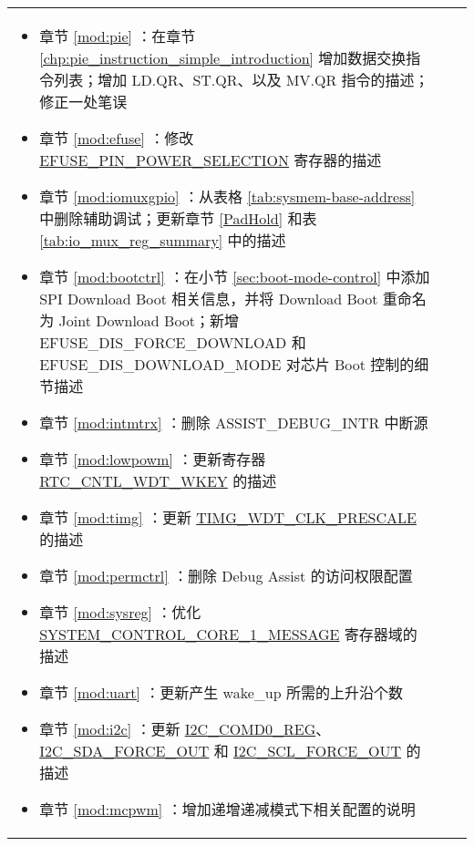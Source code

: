 \begin{longtable}[l]{ | m{2cm} | m{1.5cm} | m{12cm} | }
\begin{itemize}
        \item 章节 \ref{mod:pie} \textit{\nameref{mod:pie}}：在章节 \ref{chp:pie_instruction_simple_introduction} 增加数据交换指令列表；增加 LD.QR、ST.QR、以及 MV.QR 指令的描述；修正一处笔误 %
        \item 章节 \ref{mod:efuse} \textit{\nameref{mod:efuse}}：修改 \hyperref[fielddesc:EFUSEPINPOWERSELECTION]{EFUSE\_PIN\_POWER\_SELECTION} 寄存器的描述 %
        \item 章节 \ref{mod:iomuxgpio} \textit{\nameref{mod:iomuxgpio}}：从表格 \ref{tab:sysmem-base-address} 中删除辅助调试；更新章节 \ref{PadHold} 和表 \ref{tab:io_mux_reg_summary} 中的描述 %
        \item 章节 \ref{mod:bootctrl} \textit{\nameref{mod:bootctrl}}：在小节 \ref{sec:boot-mode-control} 中添加 SPI Download Boot 相关信息，并将 Download Boot 重命名为 Joint Download Boot；新增 EFUSE\_DIS\_FORCE\_DOWNLOAD 和 EFUSE\_DIS\_DOWNLOAD\_MODE 对芯片 Boot 控制的细节描述 %
        \item 章节 \ref{mod:intmtrx} \textit{\nameref{mod:intmtrx}}：删除 ASSIST\_DEBUG\_INTR 中断源 %
        \item 章节 \ref{mod:lowpowm} \textit{\nameref{mod:lowpowm}}：更新寄存器 \hyperref[fielddesc:RTCCNTLWDTWKEY]{RTC\_CNTL\_WDT\_WKEY} 的描述 %
        \item 章节 \ref{mod:timg} \textit{\nameref{mod:timg}}：更新 \hyperref[fielddesc:TIMGWDTCLKPRESCALE]{TIMG\_WDT\_CLK\_PRESCALE} 的描述 %
        \item 章节 \ref{mod:permctrl} \textit{\nameref{mod:permctrl}}：删除 Debug Assist 的访问权限配置  %
        \item 章节 \ref{mod:sysreg} \textit{\nameref{mod:sysreg}}：优化 \hyperref[fielddesc:SYSTEMCONTROLCORE1MESSAGE]{SYSTEM\_CONTROL\_CORE\_1\_MESSAGE} 寄存器域的描述 %
        \item 章节 \ref{mod:uart} \textit{\nameref{mod:uart}}：更新产生 wake\_up 所需的上升沿个数 %
        \item 章节 \ref{mod:i2c} \textit{\nameref{mod:i2c}}：更新 \hyperref[regdesc:I2CCOMD0REG]{I2C\_COMD0\_REG}、\hyperref[fielddesc:I2CSDAFORCEOUT]{I2C\_SDA\_FORCE\_OUT} 和 \hyperref[fielddesc:I2CSCLFORCEOUT]{I2C\_SCL\_FORCE\_OUT} 的描述 %
        \item 章节 \ref{mod:mcpwm} \textit{\nameref{mod:mcpwm}}：增加递增递减模式下相关配置的说明 %
    \end{itemize}

\end{longtable}
